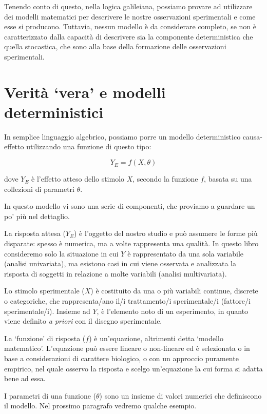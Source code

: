 \documentclass[a4paper,12pt,oneside]{book}
\begin{document}
Tenendo conto di questo, nella logica galileiana, possiamo provare ad utilizzare dei modelli matematici per descrivere le nostre osservazioni sperimentali e come esse si producono. Tuttavia, nessun modello è da considerare completo, se non è caratterizzato dalla capacità di descrivere sia la componente deterministica che quella stocastica, che sono alla base della formazione delle osservazioni sperimentali.

\hypertarget{verita-vera-e-modelli-deterministici}{%
\section{Verità `vera' e modelli deterministici}\label{verita-vera-e-modelli-deterministici}}

In semplice linguaggio algebrico, possiamo porre un modello deterministico causa-effetto utilizzando una funzione di questo tipo:

\[ Y_E = f(X, \theta) \]

dove \(Y_E\) è l'effetto atteso dello stimolo \(X\), secondo la funzione \(f\), basata su una collezioni di parametri \(\theta\).

In questo modello vi sono una serie di componenti, che proviamo a guardare un po' più nel dettaglio.

La risposta attesa (\(Y_E\)) è l'oggetto del nostro studio e può assumere le forme più disparate: spesso è numerica, ma a volte rappresenta una qualità. In questo libro consideremo solo la situazione in cui \(Y\) è rappresentato da una sola variabile (analisi univariata), ma esistono casi in cui viene osservata e analizzata la risposta di soggetti in relazione a molte variabili (analisi multivariata).

Lo stimolo sperimentale (\(X\)) è costituito da una o più variabili continue, discrete o categoriche, che rappresenta/ano il/i trattamento/i sperimentale/i (fattore/i sperimentale/i). Insieme ad \(Y\), è l'elemento noto di un esperimento, in quanto viene definito \emph{a priori} con il disegno sperimentale.

La `funzione' di risposta (\(f\)) è un'equazione, altrimenti detta `modello matematico'. L'equazione può essere lineare o non-lineare ed è selezionata o in base a considerazioni di carattere biologico, o con un approccio puramente empirico, nel quale osservo la risposta e scelgo un'equazione la cui forma si adatta bene ad essa.

I parametri di una funzione (\(\theta\)) sono un insieme di valori numerici che definiscono il modello. Nel prossimo paragrafo vedremo qualche esempio.
\end{document}
